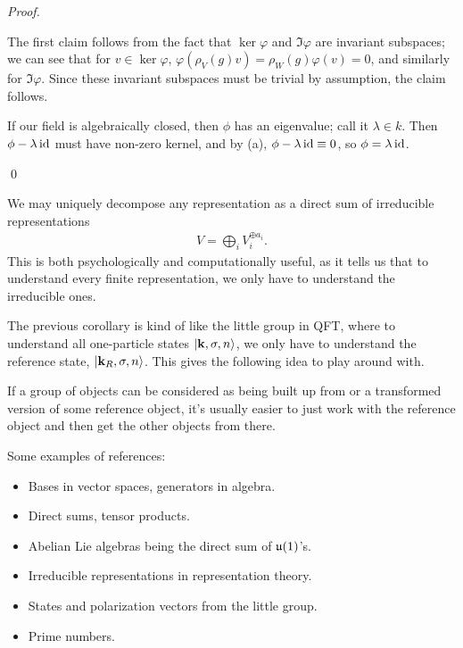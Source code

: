 \documentclass[11pt]{article}
\begin{document}
\begin{proof}
    \begin{alphamerate}
        \item The first claim follows from the fact that $\ker{\varphi}$
        and $\Im{\varphi}$ are invariant subspaces; we can see that for
        $v \in \ker{\varphi}$, $\varphi(\rho_V(g) v) = \rho_W(g) \varphi(v) = 0$,
        and similarly for $\Im{\varphi}$. Since these invariant subspaces
        must be trivial by assumption, the claim follows.
        \item If our field is algebraically closed, then $\phi$ has an eigenvalue;
        call it $\lambda \in k$. Then $\phi - \lambda \operatorname{id}$ must have non-zero kernel,
        and by (a), $\phi - \lambda \operatorname{id} \equiv 0$, so $\phi = \lambda \operatorname{id}$.
    \end{alphamerate}
    \qed
\end{proof}

\begin{corollary}
    We may uniquely decompose any representation as a direct
    sum of irreducible representations
    \begin{align*}
        V = \bigoplus_i V_i^{\oplus a_i}.
    \end{align*}
    This is both psychologically and computationally useful,
    as it tells us that to understand every finite representation,
    we only have to understand the irreducible ones.
\end{corollary}

\begin{reemark}
    The previous corollary is kind of like the little group in QFT, 
    where to understand all one-particle states $\lvert\mathbf{k}, \sigma, n\rangle$, 
    we only have to understand the reference state, $\lvert\mathbf{k}_R, \sigma, n\rangle$.
    This gives the following idea to play around with.
\end{reemark}

\begin{iidea}
    [References]
    If a group of objects can be considered as being built up from or a transformed
    version of some reference object, it's usually easier to just work with
    the reference object and then get the other objects from there.
\end{iidea}

\begin{eexample}
    Some examples of references:
    \begin{itemize}
        \item Bases in vector spaces, generators in algebra.
        \item Direct sums, tensor products.
        \item Abelian Lie algebras being the direct sum of $\mathfrak{u}(1)$'s.  
        \item Irreducible representations in representation theory.
        \item States and polarization vectors from the little group.
        \item Prime numbers.
    \end{itemize}
\end{eexample}
\end{document}
